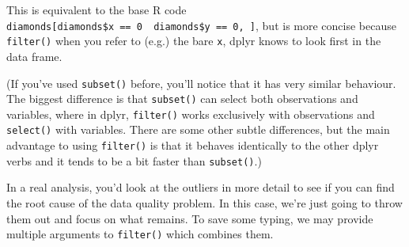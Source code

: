 \begin{Shaded}
\begin{Highlighting}[]
\StringTok{ } \NormalTok{|}\StringTok{ }\StringTok{ }\NormalTok{)}
\CommentTok{#> }
\end{Highlighting}
\end{Shaded}

This is equivalent to the base R code
\texttt{diamonds{[}diamonds\$x\ ==\ 0\ \textbar{}\ diamonds\$y\ ==\ 0,\ {]}},
but is more concise because \texttt{filter()} when you refer to (e.g.)
the bare \texttt{x}, dplyr knows to look first in the data frame.

(If you've used \texttt{subset()} before, you'll notice that it has very
similar behaviour. The biggest difference is that \texttt{subset()} can
select both observations and variables, where in dplyr,
\texttt{filter()} works exclusively with observations and
\texttt{select()} with variables. There are some other subtle
differences, but the main advantage to using \texttt{filter()} is that
it behaves identically to the other dplyr verbs and it tends to be a bit
faster than \texttt{subset()}.)

In a real analysis, you'd look at the outliers in more detail to see if
you can find the root cause of the data quality problem. In this case,
we're just going to throw them out and focus on what remains. To save
some typing, we may provide multiple arguments to \texttt{filter()}
which combines them.

